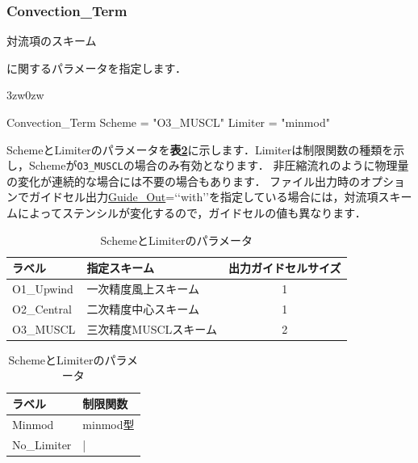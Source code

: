 \pagebreak
\subsubsection{Convection\_Term}

\hypertarget{tgt:convection_term}{対流項のスキーム}に関するパラメータを指定します．

\begin{indentation}{3zw}{0zw}

{\small
\begin{program}
  Convection_Term {
    Scheme  = "O3_MUSCL"
    Limiter = "minmod"
  }
\end{program}
}

SchemeとLimiterのパラメータを\textbf{表\ref{tbl:scheme limiter}}に示します．Limiterは制限関数の種類を示し，Schemeが\verb|O3_MUSCL|の場合のみ有効となります．
非圧縮流れのように物理量の変化が連続的な場合には不要の場合もあります．
ファイル出力時のオプションでガイドセル出力\hyperlink{tgt:fileio}{Guide\_Out}=\lq\lq with\rq\rq を指定している場合には，対流項スキームによってステンシルが変化するので，ガイドセルの値も異なります．

\begin{table}[htdp]
\small
\caption{SchemeとLimiterのパラメータ}
\begin{minipage}{.6\textwidth}
\begin{center}
\begin{tabular}{llc} \toprule
ラベル& 指定スキーム & 出力ガイドセルサイズ\\ \midrule
O1\_Upwind & 一次精度風上スキーム & 1\\
O2\_Central & 二次精度中心スキーム & 1\\
O3\_MUSCL & 三次精度MUSCLスキーム & 2\\ \bottomrule
\end{tabular}
\end{center}
\end{minipage} \hfill
\begin{minipage}{.38\textwidth}
\begin{center}
\begin{tabular}{ll} \toprule
ラベル & 制限関数\\ \midrule
Minmod & minmod型\\
No\_Limiter & | \\ \bottomrule
\end{tabular}
\end{center}
\end{minipage}
\label{tbl:scheme limiter}
\end{table}

\end{indentation}




